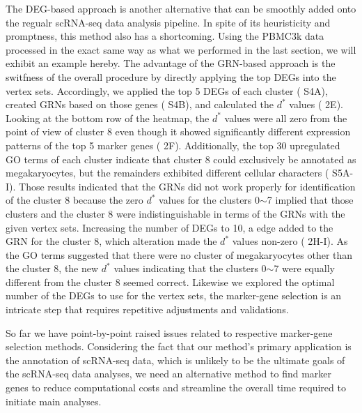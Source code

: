 \documentclass{article}
\begin{document}
The DEG-based approach is another alternative that can be smoothly added onto the regualr scRNA-seq data 
analysis pipeline. In spite of its heuristicity and promptness, this method also has a shortcoming. Using the 
PBMC3k data processed in the exact same way as what we performed in the last section, we will exhibit an 
example hereby. The advantage of the GRN-based approach is the switfness of the overall procedure by directly 
applying the top DEGs into the vertex sets. Accordingly, we applied the top 5 DEGs of each cluster (\figurename{ S4A}), 
created GRNs based on those genes (\figurename{ S4B}), and calculated the $d^*$ values (\figurename{ 2E}). Looking at the bottom 
row of the heatmap, the $d^*$ values were all zero from the point of view of cluster 8 even though it 
showed significantly different expression patterns of the top 5 marker genes (\figurename{ 2F}). Additionally, the top 30 
upregulated GO terms of each cluster indicate that cluster 8 could exclusively be annotated as megakaryocytes, but 
the remainders exhibited different cellular characters (\figurename{ S5A-I}). Those results indicated that the GRNs did 
not work properly for identification of the cluster 8 because the zero $d^*$ values for the clusters 0$\sim$7 implied that those 
clusters and the cluster 8 were indistinguishable in terms of the GRNs with the given vertex sets. Increasing 
the number of DEGs to 10, a edge added to the GRN for the cluster 8, which alteration made the $d^*$ values non-zero 
(\figurename{ 2H-I}). As the GO terms suggested that there were no cluster of megakaryocytes other than the cluster 8, 
the new $d^*$ values indicating that the clusters 0$\sim$7 were equally different from the cluster 8 seemed correct. Likewise 
we explored the optimal number of the DEGs to use for the vertex sets, the marker-gene selection is an intricate 
step that requires repetitive adjustments and validations. 

So far we have point-by-point raised issues related to respective marker-gene selection methods. Considering the 
fact that our method's primary application is the annotation of scRNA-seq data, which is unlikely to be the 
ultimate goals of the scRNA-seq data analyses, we need an alternative method to find marker genes to reduce 
computational costs and streamline the overall time required to initiate main analyses.
\end{document}
